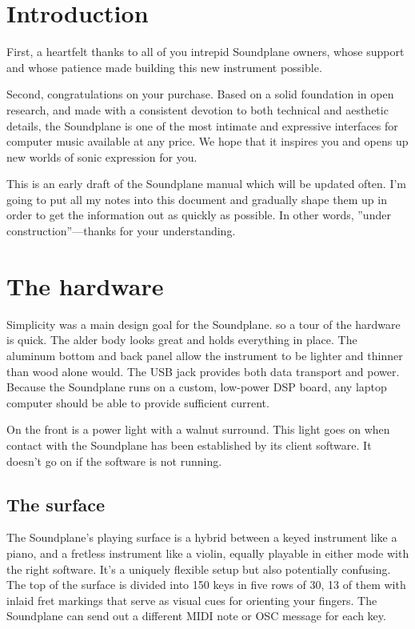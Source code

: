 \chapter{Introduction}

First, a heartfelt thanks to all of you intrepid Soundplane owners, whose support and whose patience made building this new instrument possible. 

Second, congratulations on your purchase.  Based on a solid foundation in open research, and made with a consistent devotion to both technical and aesthetic details, the Soundplane is one of the most intimate and expressive interfaces for computer music available at any price.  We hope that it inspires you and opens up new worlds of sonic expression for you. 

This is an early draft of the Soundplane manual which will be updated often.  I'm going to put all my notes into this document and gradually shape them up in order to get the information out as quickly as possible.  In other words, ”under construction”—thanks for your understanding. 


\setcounter{secnumdepth}{0}

\chapter{The hardware}

Simplicity was a main design goal for the Soundplane. so a tour of the hardware is quick.  The alder body looks great and holds everything in place.  The aluminum bottom and back panel allow the instrument to be lighter and thinner than wood alone would.  The USB jack provides both data transport and power.  Because the Soundplane runs on a custom, low-power DSP board, any laptop computer should be able to provide sufficient current.

On the front is a power light with a walnut surround.  This light goes on when contact with the Soundplane has been established by its client software.  It doesn't go on if the software is not running.  

\section{The surface}

The Soundplane’s playing surface is a hybrid between a keyed instrument like a piano, and a fretless instrument like a violin, equally playable in either mode with the right software.  It's a uniquely flexible setup but also potentially confusing.  The top of the surface is divided into 150 keys in five rows of 30, 13 of them with inlaid fret markings that serve as visual cues for orienting your fingers.  The Soundplane can send out a different MIDI note or OSC message for each key.  

